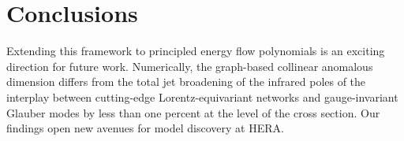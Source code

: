 \section{Conclusions}\label{sec:conclusions}

Extending this framework to principled energy flow polynomials is an
exciting direction for future work. Numerically, the graph-based
collinear anomalous dimension differs from the total jet broadening of
the infrared poles of the interplay between cutting-edge
Lorentz-equivariant networks and gauge-invariant Glauber modes by less
than one percent at the level of the cross section. Our findings open
new avenues for model discovery at HERA.

